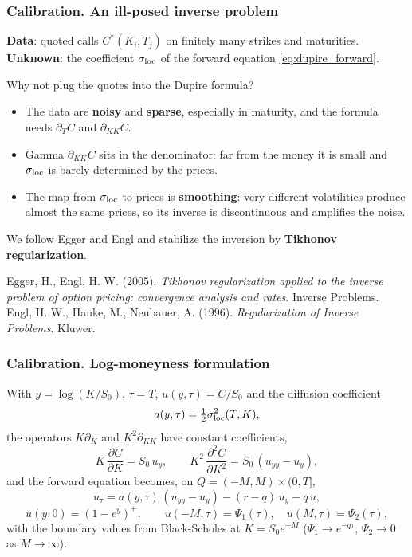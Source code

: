 
\begin{frame}
\frametitle{Calibration. An ill-posed inverse problem}
\begin{scriptsize}
\textbf{Data}: quoted calls $C^*(K_i, T_j)$ on finitely many strikes and maturities.
\textbf{Unknown}: the coefficient $\sigma_{\mathrm{loc}}$ of the forward equation \eqref{eq:dupire_forward}.
\medskip

Why not plug the quotes into the Dupire formula?
\begin{itemize}
\item The data are \textbf{noisy} and \textbf{sparse}, especially in maturity,
and the formula needs $\partial_T C$ and $\partial_{KK} C$.
\item Gamma $\partial_{KK} C$ sits in the denominator:
far from the money it is small and $\sigma_{\mathrm{loc}}$ is barely determined by the prices.
\item The map from $\sigma_{\mathrm{loc}}$ to prices is \textbf{smoothing}:
very different volatilities produce almost the same prices,
so its inverse is discontinuous and amplifies the noise.
\end{itemize}
\medskip
We follow Egger and Engl and stabilize the inversion by \textbf{Tikhonov regularization}.
\medskip

Egger, H., Engl, H. W. (2005). \emph{Tikhonov regularization applied to the inverse problem of option pricing: convergence analysis and rates}. Inverse Problems.\\
Engl, H. W., Hanke, M., Neubauer, A. (1996). \emph{Regularization of Inverse Problems}. Kluwer.
\end{scriptsize}
\end{frame}

\begin{frame}
\frametitle{Calibration. Log-moneyness formulation}
\begin{scriptsize}
With $y = \log(K/S_0)$, $\tau = T$, $u(y, \tau) = C/S_0$ and the diffusion coefficient
\begin{equation*}
    a(y,\tau) = \tfrac{1}{2}\sigma_{\mathrm{loc}}^2(T,K),
\end{equation*}
the operators $K\partial_K$ and $K^2\partial_{KK}$ have constant coefficients,
\begin{equation*}
    K\,\frac{\partial C}{\partial K} = S_0\,u_y,
    \qquad
    K^2\,\frac{\partial^2 C}{\partial K^2} = S_0\,(u_{yy} - u_y),
\end{equation*}
and the forward equation becomes, on $Q = (-M, M) \times (0, T]$,
\begin{equation}\label{eq:forward_y}
    u_\tau = a(y,\tau)\,(u_{yy} - u_y) - (r-q)\,u_y - q\,u,
\end{equation}
\begin{equation*}
    u(y, 0) = (1 - e^y)^+,
    \qquad u(-M, \tau) = \Psi_1(\tau), \quad u(M, \tau) = \Psi_2(\tau),
\end{equation*}
with the boundary values from Black-Scholes at $K = S_0 e^{\pm M}$
($\Psi_1 \to e^{-q\tau}$, $\Psi_2 \to 0$ as $M \to \infty$).
\end{scriptsize}
\end{frame}

